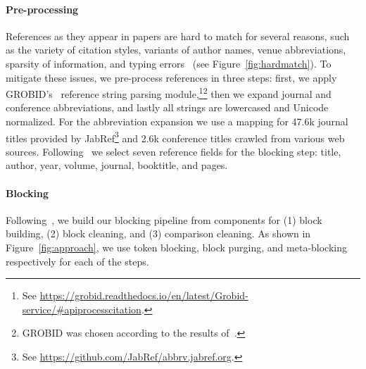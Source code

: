 
\paragraph{Pre-processing}
References as they appear in papers are hard to match for several reasons, such as the variety of citation styles, variants of author names, venue abbreviations, sparsity of information, and typing errors~\cite{Christen2012} (see Figure~\ref{fig:hardmatch}). To mitigate these issues, we pre-process references in three steps: first, we apply GROBID's~\cite{Lopez2009} reference string parsing module,\footnote{See \url{https://grobid.readthedocs.io/en/latest/Grobid-service/\#apiprocesscitation}.}\footnote{GROBID was chosen according to the results of~\cite{Tkaczyk2018}.} then we expand journal and conference abbreviations, and lastly all strings are lowercased and Unicode normalized. For the abbreviation expansion we use a mapping for 47.6k journal titles provided by JabRef\footnote{See \url{https://github.com/JabRef/abbrv.jabref.org}.} and 2.6k conference titles crawled from various web sources. Following~\cite{Koo2011} we select seven reference fields for the blocking step: title, author, year, volume, journal, booktitle, and pages.

\paragraph{Blocking}
Following~\cite{Papadakis2016}, we build our blocking pipeline from components for (1) block building, (2) block cleaning, and (3) comparison cleaning. As shown in Figure~\ref{fig:approach}, we use token blocking, block purging, and meta-blocking respectively for each of the steps.

